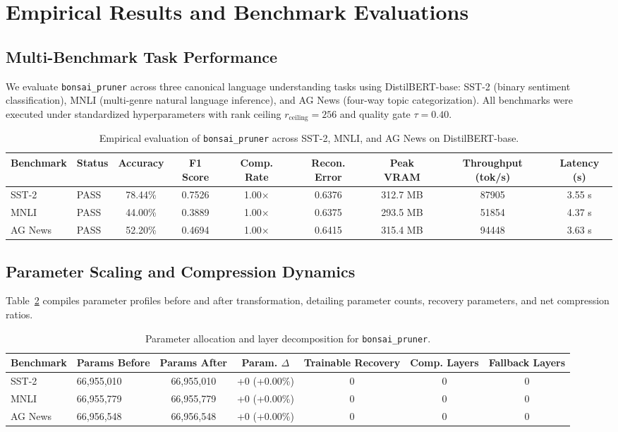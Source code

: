 \section{Empirical Results and Benchmark Evaluations}
\label{sec:results}

\subsection{Multi-Benchmark Task Performance}
We evaluate \texttt{bonsai\_pruner} across three canonical language understanding tasks using DistilBERT-base: SST-2 (binary sentiment classification), MNLI (multi-genre natural language inference), and AG News (four-way topic categorization). All benchmarks were executed under standardized hyperparameters with rank ceiling $r_{\mathrm{ceiling}} = 256$ and quality gate $\tau = 0.40$.

\begin{table}[t]
\centering
\small
\begin{tabular}{llccccccc}
\toprule
\textbf{Benchmark} & \textbf{Status} & \textbf{Accuracy} & \textbf{F1 Score} & \textbf{Comp. Rate} & \textbf{Recon. Error} & \textbf{Peak VRAM} & \textbf{Throughput (tok/s)} & \textbf{Latency (s)} \\
\midrule
SST-2 & PASS & 78.44\% & 0.7526 & 1.00$\times$ & 0.6376 & 312.7 MB & 87905 & 3.55 s \\
MNLI & PASS & 44.00\% & 0.3889 & 1.00$\times$ & 0.6375 & 293.5 MB & 51854 & 4.37 s \\
AG News & PASS & 52.20\% & 0.4694 & 1.00$\times$ & 0.6415 & 315.4 MB & 94448 & 3.63 s \\
\bottomrule
\end{tabular}
\caption{Empirical evaluation of \texttt{bonsai\_pruner} across SST-2, MNLI, and AG News on DistilBERT-base.}
\label{tab:results_bonsai_pruner}
\end{table}

\subsection{Parameter Scaling and Compression Dynamics}
Table~\ref{tab:params_bonsai_pruner} compiles parameter profiles before and after transformation, detailing parameter counts, recovery parameters, and net compression ratios.

\begin{table}[t]
\centering
\small
\begin{tabular}{llccccc}
\toprule
\textbf{Benchmark} & \textbf{Params Before} & \textbf{Params After} & \textbf{Param. $\Delta$} & \textbf{Trainable Recovery} & \textbf{Comp. Layers} & \textbf{Fallback Layers} \\
\midrule
SST-2 & 66,955,010 & 66,955,010 & +0 (+0.00\%) & 0 & 0 & 0 \\
MNLI & 66,955,779 & 66,955,779 & +0 (+0.00\%) & 0 & 0 & 0 \\
AG News & 66,956,548 & 66,956,548 & +0 (+0.00\%) & 0 & 0 & 0 \\
\bottomrule
\end{tabular}
\caption{Parameter allocation and layer decomposition for \texttt{bonsai\_pruner}.}
\label{tab:params_bonsai_pruner}
\end{table}

